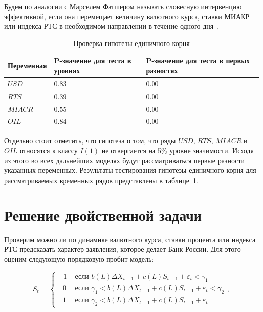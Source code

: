 \documentclass[14pt,a4paper, oneside]{extreport}
\theoremstyle{plain}              %
\theoremstyle{definition}         %
\begin{document}
Будем по аналогии с Марселем Фатшером называть словесную интервенцию эффективной, если она перемещает величину валютного курса, ставки МИАКР или индекса РТС в необходимом направлении в течение одного дня~\cite{fratzscher2008communication}.

\begin{table}[h]
	\begin{center}
		\caption{Проверка гипотезы единичного корня}\label{unitroot}
		\begin{tabular}{|m{2.5cm}|m{6cm}|m{6cm}|}
  		\hline
  		Переменная & P-значение для теста в уровнях & P-значение для теста в первых разностях \\ \hline
    	$USD$ & $0.83$ & $0.00$  \\ \hline
  		$RTS$ & $0.39$ & $0.00$ \\ \hline
  		$MIACR$ & $0.55$ & $0.00$ \\ \hline
  		$OIL$ & $0.84$ & $0.00$ \\ \hline
		\end{tabular}
	\end{center}
\end{table}


Отдельно стоит отметить, что гипотеза о том, что ряды $USD$, $RTS$, $MIACR$ и $OIL$ относятся к классу $I(1)$ не отвергается на 5\% уровне значимости. Исходя из этого во всех дальнейших моделях будут рассматриваться первые разности указанных переменных. Результаты тестирования гипотезы единичного корня для рассматриваемых временных рядов представлены в таблице~\ref{unitroot}.


\section{Решение двойственной задачи}

Проверим можно ли по динамике валютного курса, ставки процента или индекса РТС предсказать характер заявления, которое делает Банк России. Для этого оценим следующую порядковую пробит-модель:

\begin{equation}
S_t = \begin{cases} -1 &\text{ если } b(L) \Delta X_{t-1} + c(L) S_{t-1} + \varepsilon_t < \gamma_1 \\
\mbox{ }0 &\text{ если } \gamma_1 < b(L) \Delta X_{t-1} + c(L) S_{t-1} + \varepsilon_t < \gamma_2 \\
\mbox{ }1 &\text{ если } \gamma_2 < b(L) \Delta X_{t-1} + c(L) S_{t-1} + \varepsilon_t 
\end{cases}, 
\end{equation}
\end{document}
